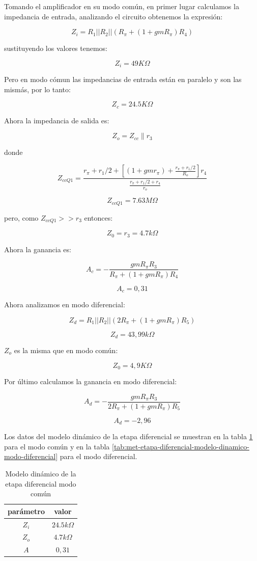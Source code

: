Tomando el amplificador en su modo común, en primer lugar calculamos la impedancia de entrada, analizando el circuito obtenemos la expresión:

$$ Z_i = R_1 || R_2 || (R_\pi + (1 + gmR_\pi)R_4)$$

sustituyendo los valores tenemos:

$$ Z_i = 49K\Omega$$

Pero en modo cómun las impedancias de entrada están en paralelo y son las mismás, por lo tanto:

$$ Z_c = 24.5K\Omega$$

Ahora la impedancia de salida es:

$$ Z_o = Z_{cc} \parallel r_3$$

donde

$$ Z_{ccQ1} = \frac{r_\pi + r_1/2 + [(1 + gmr_\pi) + \frac{r_\pi + r_1/2}{R_o}] r_4}{\frac{r_\pi + r_1/2 + r_4}{r_o}}$$

$$ Z_{ccQ1} = 7.63 M\Omega$$

pero, como $Z_{ccQ1} >> r_3$ entonces:

$$ Z_0 = r_3 = 4.7k\Omega$$

Ahora la ganancia es:

$$A_c = - \frac{ gmR_\pi R_3}{R_\pi + (1 + gmR_\pi)R_4}$$

$$A_c = 0,31$$

Ahora analizamos en modo diferencial:

$$Z_d = R_1 || R_2 || (2R_\pi + (1+gmR_\pi )R_5)$$

$$Z_d = 43,99 k\Omega$$

$Z_o$ es la misma que en modo común:

$$Z_0 = 4,9 K\Omega$$

Por último calculamos la ganancia en modo diferencial:

$$A_d = -\frac{gmR_\pi R_3}{2R_\pi + (1 + gmR_\pi) R_5}$$

$$A_d = -2,96 $$

Los datos del modelo dinámico de la etapa diferencial se muestran en la tabla \ref{tab:met-etapa-diferencial-modelo-dinamico-modo-comun} para el modo común y en la tabla \ref{tab:met-etapa-diferencial-modelo-dinamico-modo-diferencial} para el modo diferencial.

\begin{table}[ht]
    \centering
    \begin{tabular}{|c|c|}
        \hline
        parámetro & valor  \\
        \hline
        $Z_i$ & $24.5k\Omega$ \\
        \hline
        $Z_o$ & $4.7k\Omega$ \\
        \hline
        $A$ & $0,31$ \\
        \hline
    \end{tabular}
    \caption{Modelo dinámico de la etapa diferencial modo común}
    \label{tab:met-etapa-diferencial-modelo-dinamico-modo-comun}
\end{table}

